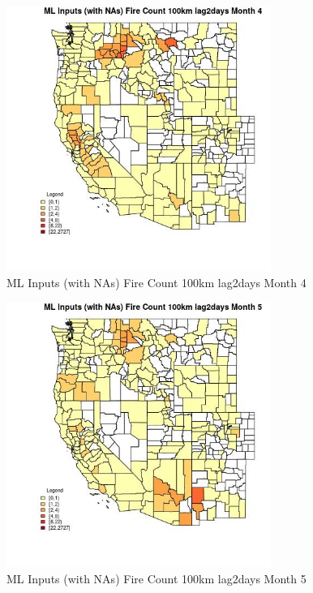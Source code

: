 \begin{figure} 
\centering  
\includegraphics[width=0.77\textwidth]{Code_Outputs/Report_ML_input_PM25_Step4_part_f_de_duplicated_aveswNAs_CountyFire_Count_100km_lag2daysmedianMonth4.jpg} 
\caption{\label{fig:Report_ML_input_PM25_Step4_part_f_de_duplicated_aveswNAsCountyFire_Count_100km_lag2daysmedianMonth4}ML Inputs (with NAs) Fire Count 100km lag2days Month 4} 
\end{figure} 
 

\begin{figure} 
\centering  
\includegraphics[width=0.77\textwidth]{Code_Outputs/Report_ML_input_PM25_Step4_part_f_de_duplicated_aveswNAs_CountyFire_Count_100km_lag2daysmedianMonth5.jpg} 
\caption{\label{fig:Report_ML_input_PM25_Step4_part_f_de_duplicated_aveswNAsCountyFire_Count_100km_lag2daysmedianMonth5}ML Inputs (with NAs) Fire Count 100km lag2days Month 5} 
\end{figure} 
 

